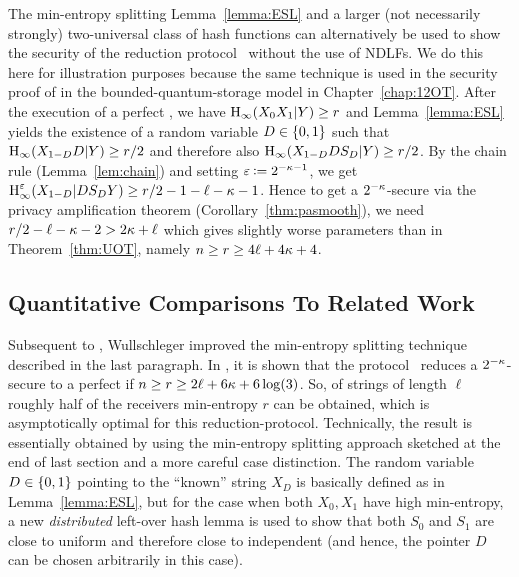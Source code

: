 The min-entropy splitting Lemma~\ref{lemma:ESL} and a larger (not
necessarily strongly) two-universal class of hash functions can
alternatively be used to show the security of the reduction protocol
\OTUOT\ without the use of 
NDLFs. We do this here for illustration
purposes because the same technique is used in the security proof of
\OT in the bounded-quantum-storage model in Chapter~\ref{chap:12OT}.
After the execution of a perfect , we
have $\hmin(X_0 X_1|Y) \geq r$ and Lemma~\ref{lemma:ESL} yields the
existence of a random variable $D \in \set{0,1}$ such that
$\hmin(X_{1-D} D | Y) \geq r/2$ and therefore also $\hmin(X_{1-D} D
  S_D | Y) \geq r/2$. By the chain rule (Lemma~\ref{lem:chain}) and
setting $\eps \assign 2^{-\sp-1}$, we get $\hiee{X_{1-D} | D S_D Y}
\geq r/2 -1 - \ell - \sp -1$. Hence to get a $2^{-\sp}$-secure
\RandlStringOT via the privacy amplification theorem
(Corollary~\ref{thm:pasmooth}), we need $r/2 - \ell - \sp -2 > 2
\kappa + \ell$ which gives slightly worse parameters than in
Theorem~\ref{thm:UOT}, namely $n \geq r \geq 4 \ell + 4 \sp +4$.


\subsection{Quantitative Comparisons To Related Work}\label{sec:comparison}
Subsequent to \cite{DFSS06}, Wullschleger improved the min-entropy
splitting technique  described in
the last paragraph. In \cite{Wullschleger07}, it is shown that the
protocol \OTUOT\ reduces a $2^{-\sp}$-secure \RandlStringOT to a
perfect  if $n \geq r \geq 2 \ell + 6
\sp + 6 \log(3)$. So, \RandlStringOT of strings of length $\ell$
roughly half of the receivers min-entropy $r$ can be obtained, which
is asymptotically optimal for this reduction-protocol. Technically,
the result is essentially obtained by using the min-entropy splitting
approach sketched at the end of last section and a more careful case
distinction. The random variable $D \in \set{0,1}$ pointing to the
``known'' string $X_D$ is basically defined as in
Lemma~\ref{lemma:ESL}, but for the case when both $X_0,X_1$ have high
min-entropy, a new \emph{distributed} left-over hash lemma is used to show
that both $S_0$ and $S_1$ are close to uniform and therefore close to
independent (and hence, the pointer $D$ can be chosen arbitrarily in
this case).

